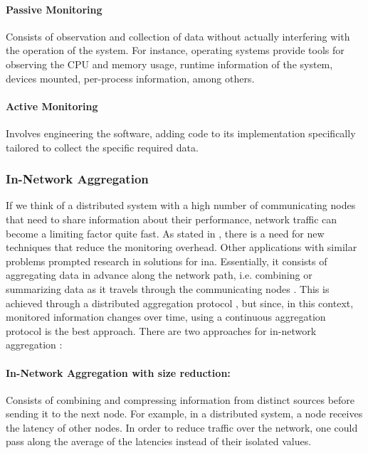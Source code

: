 \paragraph{Passive Monitoring}
\label{par:passivemonitoring}
Consists of observation and collection of data without actually interfering with the operation of the system. For instance, operating systems provide tools for observing the CPU and memory usage, runtime information of the system, devices mounted, per-process information, among others.
\paragraph{Active Monitoring}
\label{par:activemonitoring}
\par Involves engineering the software, adding code to its implementation specifically tailored to collect the specific required data.
%
%
%
\subsubsection{In-Network Aggregation}
\label{sssec:innetworkaggregation}
\par If we think of a distributed system with a high number of communicating nodes that need to share information about their performance, network traffic can become a limiting factor quite fast. As stated in \cite{Oreizy1999a}, there is a need for new techniques that reduce the monitoring overhead. Other applications with similar problems prompted research in solutions for \gls{ina}. Essentially, it consists of aggregating data in advance along the network path, i.e. combining or summarizing data as it travels through the communicating nodes \cite{Feng2023}. This is achieved through a distributed aggregation protocol \cite{Costa2018}, but since, in this context, monitored information changes over time, using a continuous aggregation protocol is the best approach. There are two approaches for in-network aggregation \cite{Fasolo2007}:
\paragraph{In-Network Aggregation with size reduction:} Consists of combining and compressing information from distinct sources before sending it to the next node. For example, in a distributed system, a node receives the latency of other nodes. In order to reduce traffic over the network, one could pass along the average of the latencies instead of their isolated values.
